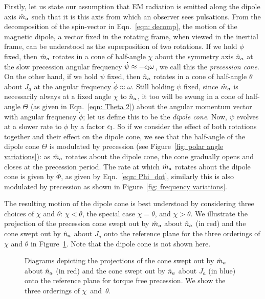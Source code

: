 \documentclass[../full_thesis/full_thesis.tex]{subfiles}
\begin{document}
Firstly, let us state our assumption that EM radiation is emitted along the
dipole axis $\hat{m}_a$ such that it is this axis from which an observer sees
pulsations.  From the decomposition of the spin-vector in Eqn.~\eqref{eqn:
decomp}, the motion of the magnetic dipole, a vector fixed in the rotating
frame, when viewed in the inertial frame, can be understood as the
superposition of two rotations.  If we hold $\phi$ fixed, then $\hat{m}_a$ rotates
in a cone of half-angle $\chi$ about the symmetry axis $\hat{n}_a$ at the slow
precession angular frequency $\dot{\psi}\approx -\epsilon_{\mathrm{I}} \omega$, we call this
the \emph{precession cone}. On the other
hand, if we hold $\psi$ fixed, then $\hat{n}_a$ rotates in a cone of half-angle
$\theta$ about $J_{a}$ at the angular frequency $\dot{\phi} \approx \omega$.
Still holding $\psi$ fixed, since $\hat{m}_a$ is necessarily always at a fixed angle
$\chi$ to $\hat{n}_a$, it too will be swung in a cone of half-angle $\Theta$ (as
given in Eqn.~\eqref{eqn: Theta 2}) about the angular momentum vector with
angular frequency $\dot{\phi}$; let us define this to be the \emph{dipole
cone}. Now, $\psi$ evolves at a slower rate to $\phi$ by a factor $\epsilon_{\mathrm{I}}$. So
if we consider the effect of both rotations together and their effect on the 
dipole cone, we see that the
half-angle of the dipole cone $\Theta$ is modulated by precession (see
Figure~\ref{fig: polar angle variations}): as $\hat{m}_a$ rotates about the dipole
cone, the cone gradually opens and closes at the precession period. The rate at
which $\hat{m}_a$ rotates about the dipole cone is given by $\dot{\Phi}$, as given
by Eqn.~\eqref{eqn: Phi_dot}, similarly this is also modulated by precession as
shown in Figure~\ref{fig: frequency variations}. 

The resulting motion of the dipole cone is best understood by considering three
choices of $\chi$ and $\theta$: $\chi < \theta$, the special case $\chi =
\theta$, and $\chi > \theta$. We illustrate the projection of the precession cone swept
out by $\hat{m}_a$ about $\hat{n}_a$ (in red) and the cone swept out by $\hat{n}_a$ about $J_a$ onto
the reference plane for the three orderings of $\chi$ and $\theta$ in
Figure~\ref{fig: cones}. Note that the dipole cone is not shown here.
\begin{figure}[ht]
\centering
\caption{Diagrams depicting the projections of the cone swept out by $\hat{m}_a$
about $\hat{n}_a$ (in red) and the cone swept out by $\hat{n}_a$ about $J_a$ (in blue)
onto the reference plane for torque free precession. We show the three
orderings of $\chi$~and~$\theta$.}
\label{fig: cones}
\end{figure}
\end{document}
